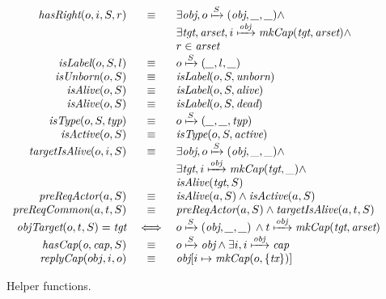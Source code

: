 
\begin{figure}
  \[
  \begin{array}{rcl}
    \FNhasRight{o}{i}{S}{r} & \equiv & \exists \ident{obj}, \mapsTo{o}{(\ident{obj},\ident{\_} ,\ident{\_})}{S} \wedge \\
    & & \exists \ident{tgt},\ident{arset}, \mapsTo{i}{\FNmkCap{\ident{tgt}}{\ident{arset}}}{\ident{obj}} \wedge \\
    & & r \in \ident{arset} \\
    \FNisLabel{o}{S}{l} & \equiv & \mapsTo{o}{(\ident{\_} , l , \ident{\_})}{S} \\
    \FNisUnborn{o}{S} & \equiv & \FNisLabel{o}{S}{\NMunborn} \\
    \FNisAlive{o}{S} & \equiv & \FNisLabel{o}{S}{\NMalive} \\
    \FNisAlive{o}{S} & \equiv & \FNisLabel{o}{S}{\NMdead} \\
    \FNisType{o}{S}{\ident{typ}} & \equiv & \mapsTo{o}{(\ident{\_} , \ident{\_} , \ident{typ})}{S} \\
    \FNisActive{o}{S} & \equiv & \FNisType{o}{S}{\NMactive} \\
    \FNtargetIsAlive{o}{i}{S} & \equiv & \exists \ident{obj}, \mapsTo{o}{(\ident{obj},\ident{\_} ,\ident{\_})}{S} \wedge \\
    & & \exists \ident{tgt}, \mapsTo{i}{\FNmkCap{\ident{tgt}}{\ident{\_}}}{\ident{obj}} \wedge \\
    & & \FNisAlive{\ident{tgt}}{S} \\
    \FNpreReqActor{a}{S} & \equiv & \FNisAlive{a}{S} \wedge \FNisActive{a}{S} \\
    \FNpreReqCommon{a}{t}{S} & \equiv & \FNpreReqActor{a}{S} \wedge \FNtargetIsAlive{a}{t}{S} \\
    \FNobjTarget{o}{t}{S} = \ident{tgt} & \iff & \mapsTo{o}{(\ident{obj},\ident{\_} ,\ident{\_})}{S} \, \wedge \mapsTo{t}{\FNmkCap{\ident{tgt}}{\ident{arset}}}{\ident{obj}} \\
    \FNhasCap{\ident{o}}{\ident{cap}}{S} & \equiv & \mapsTo{o}{\ident{obj}}{S} \wedge \exists i, \mapsTo{i}{\ident{cap}}{\ident{obj}} \\
    \FNreplyCap{obj}{i}{o} & \equiv & \ident{obj}[i \mapsto \FNmkCap{o}{\{\NMtx\}} ]
  \end{array}
  \]
  \caption{Helper functions. \label{fig:sketch:helperFunctions}}
\end{figure}


